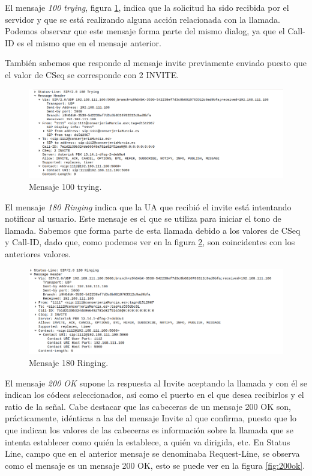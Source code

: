 \documentclass[a4paper]{article}
\begin{document}
 El mensaje \textit{100 trying}, figura \ref{fig:trying}, indica que la solicitud ha sido recibida por el servidor y que se está realizando alguna acción relacionada con la llamada. Podemos observar que este mensaje forma parte del mismo dialog, ya que el Call-ID es el mismo que en el mensaje anterior. 
 
También sabemos que responde al mensaje invite previamente enviado puesto que el valor de CSeq se corresponde con 2 INVITE.

\begin{figure}[htb]
    \begin{center}
        \includegraphics[width=1\textwidth]{100trying_1.png}
        \caption{Mensaje 100 trying.}
         \label{fig:trying}
    \end{center}
\end{figure}

 El mensaje \textit{180 Ringing} indica que la UA que recibió el invite está intentando notificar al usuario. Este mensaje es el que se utiliza para iniciar el tono de llamada. Sabemos que forma parte de esta llamada debido a los valores de CSeq y Call-ID, dado que, como podemos ver en la figura \ref{fig:ring}, son coincidentes con los anteriores valores.
\begin{figure}[htb]
    \begin{center}
        \includegraphics[width=1\textwidth]{180ring.png}
        \caption{Mensaje 180 Ringing.}
         \label{fig:ring}
    \end{center}
\end{figure}

 El mensaje \textit{200 OK} supone la respuesta al Invite aceptando la llamada y con él se indican los códecs seleccionados, así como el puerto en el que desea recibirlos y el ratio de la señal. Cabe destacar que las cabeceras de un mensaje 200 OK son, prácticamente, idénticas a las del mensaje Invite al que confirma, puesto que lo que indican los valores de las cabeceras es información sobre la llamada que se intenta establecer como quién la establece, a quién va dirigida, etc. 
 En Status Line, campo que en el anterior mensaje se denominaba Request-Line, se observa como el mensaje es un mensaje 200 OK, esto se puede ver en la figura \ref{fig:200ok}.
 
\end{document}

